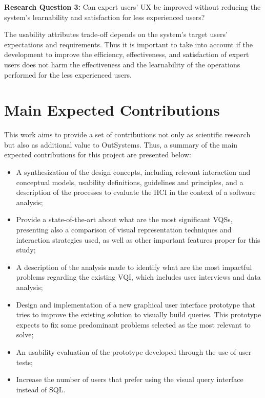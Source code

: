 \medskip

\textbf{Research Question 3:} Can expert users' \gls{UX} be improved without reducing the system's learnability and satisfaction for less experienced users?


\medskip

The usability attributes trade-off depends on the system's target users' expectations and requirements. Thus it is important to take into account if the development to improve the efficiency, effectiveness, and satisfaction of expert users does not harm the effectiveness and the learnability of the operations performed for the less experienced users.

\section{Main Expected Contributions}
\label{sec:main_exp_contributions}
This work aims to provide a set of contributions not only as scientific research but also as additional value to OutSystems. Thus, a summary of the main expected contributions for this project are presented below:

\begin{itemize}
  \item A synthesization of the design concepts, including relevant interaction and conceptual models, usability definitions, guidelines and principles, and a description of the processes to evaluate the \gls{HCI} in the context of a software analysis;
  \item Provide a state-of-the-art about what are the most significant \glspl{VQS}, presenting also a comparison of visual representation techniques and interaction strategies used, as well as other important features proper for this study;
  \item A description of the analysis made to identify what are the most impactful problems regarding the existing \gls{VQI}, which includes user interviews and data analysis;
  \item Design and implementation of a new graphical user interface prototype that tries to improve the existing solution to visually build queries. This prototype expects to fix some predominant problems selected as the most relevant to solve;
  \item An usability evaluation of the prototype developed through the use of user tests;
  \item Increase the number of users that prefer using the visual query interface instead of SQL.
\end{itemize} 

